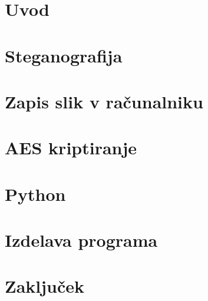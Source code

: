 \documentclass[a4paper, 12pt]{article}
\begin{document}
    \tableofcontents
    \newpage

    \section{Uvod}
        

    \newpage

    \section{Steganografija}
        


    \section{Zapis slik v računalniku}
        


    \section{AES kriptiranje}
        

    \section{Python}
        

    \section{Izdelava programa}
        

    \newpage
    \section{Zaključek}
        

    \newpage
    \printbibliography
\end{document}
